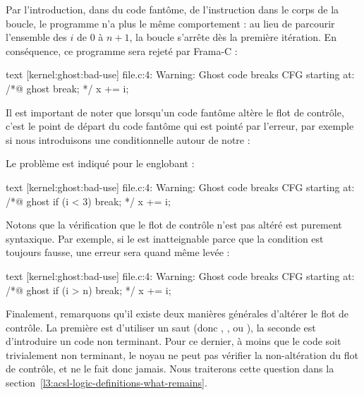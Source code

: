Par l'introduction, dans du code fantôme, de l'instruction  dans
le corps de la boucle, le programme n'a plus le même comportement : au lieu de
parcourir l'ensemble des $i$ de $0$ à $n+1$, la boucle s'arrête dès la première
itération. En conséquence, ce programme sera rejeté par Frama-C :


\begin{CodeBlock}{text}
[kernel:ghost:bad-use] file.c:4: Warning:
  Ghost code breaks CFG starting at:
  /*@ ghost break; */
  x += i;
\end{CodeBlock}


Il est important de noter que lorsqu'un code fantôme altère le flot de contrôle,
c'est le point de départ du code fantôme qui est pointé par l'erreur, par exemple
si nous introduisons une conditionnelle autour de notre  :




Le problème est indiqué pour le  englobant :


\begin{CodeBlock}{text}
[kernel:ghost:bad-use] file.c:4: Warning:
  Ghost code breaks CFG starting at:
  /*@ ghost if (i < 3) break; */
  x += i;
\end{CodeBlock}


Notons que la vérification que le flot de contrôle n'est pas altéré est purement
syntaxique. Par exemple, si le  est inatteignable parce que la
condition est toujours fausse, une erreur sera quand même levée :




\begin{CodeBlock}{text}
[kernel:ghost:bad-use] file.c:4: Warning:
  Ghost code breaks CFG starting at:
  /*@ ghost if (i > n) break; */
  x += i;
\end{CodeBlock}


Finalement, remarquons qu'il existe deux manières générales d'altérer le flot de
contrôle. La première est d'utiliser un saut (donc ,
, ou ), la seconde est d'introduire un code
non terminant. Pour ce dernier, à moins que le code soit trivialement non terminant,
le noyau ne peut pas vérifier la non-altération du flot de contrôle, et ne le fait
donc jamais. Nous traiterons cette question dans la
section~\ref{l3:acsl-logic-definitions-what-remains}.




